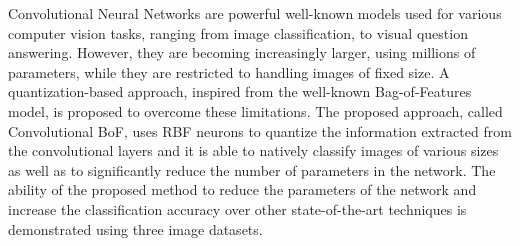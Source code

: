 \documentclass[11pt,en]{elegantpaper}
\begin{document}
Convolutional Neural Networks are powerful well-known models used for various computer vision tasks, ranging from image classification, to visual question answering. However, they are becoming increasingly larger, using millions of parameters, while they are restricted to handling images of fixed size. A quantization-based approach, inspired from the well-known Bag-of-Features model, is proposed to overcome these limitations. The proposed approach, called Convolutional BoF, uses
RBF neurons to quantize the information extracted from the convolutional layers and it is able to natively classify images of various sizes as well as to significantly reduce the number of parameters in the network. The ability of the proposed method to reduce the parameters of the network and increase the classification accuracy over other state-of-the-art techniques is demonstrated using three image datasets.
\end{document}
